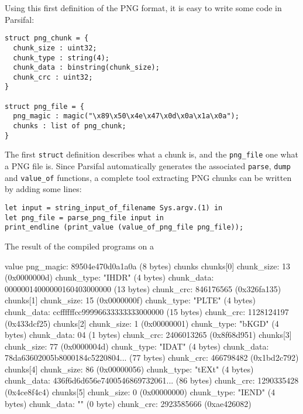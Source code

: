 \documentclass[conference]{IEEEtran}
\newenvironment{code}%
   {\scriptsize\snugshade\verbatim}%
   {\endverbatim\endsnugshade\normalsize}
\begin{document}
Using this first definition of the PNG format, it is easy to write
some code in Parsifal:

\begin{lstlisting}
struct png_chunk = {
  chunk_size : uint32;
  chunk_type : string(4);
  chunk_data : binstring(chunk_size);
  chunk_crc : uint32;
}

struct png_file = {
  png_magic : magic("\x89\x50\x4e\x47\x0d\x0a\x1a\x0a");
  chunks : list of png_chunk;
}
\end{lstlisting}

The first \texttt{struct} definition describes what a chunk is, and
the \texttt{png\_file} one what a PNG file is. Since Parsifal
automatically generates the associated \texttt{parse}, \texttt{dump}
and \texttt{value\_of} functions, a complete tool extracting PNG chunks
can be written by adding some lines:

\begin{lstlisting}
let input = string_input_of_filename Sys.argv.(1) in
let png_file = parse_png_file input in
print_endline (print_value (value_of_png_file png_file));
\end{lstlisting}

\noindent
The result of the compiled programs on a 

\begin{code}
value {
  png_magic: 89504e470d0a1a0a (8 bytes)
  chunks {
    chunks[0] {
      chunk_size: 13 (0x0000000d)
      chunk_type: "IHDR" (4 bytes)
      chunk_data: 00000014000000160403000000 (13 bytes)
      chunk_crc: 846176565 (0x326fa135)
    }
    chunks[1] {
      chunk_size: 15 (0x0000000f)
      chunk_type: "PLTE" (4 bytes)
      chunk_data: ccffffffcc99996633333333000000 (15 bytes)
      chunk_crc: 1128124197 (0x433dcf25)
    }
    chunks[2] {
      chunk_size: 1 (0x00000001)
      chunk_type: "bKGD" (4 bytes)
      chunk_data: 04 (1 bytes)
      chunk_crc: 2406013265 (0x8f68d951)
    }
    chunks[3] {
      chunk_size: 77 (0x0000004d)
      chunk_type: "IDAT" (4 bytes)
      chunk_data: 78da63602005b8000184c5220804... (77 bytes)
      chunk_crc: 466798482 (0x1bd2c792)
    }
    chunks[4] {
      chunk_size: 86 (0x00000056)
      chunk_type: "tEXt" (4 bytes)
      chunk_data: 436f6d6d656e7400546869732061... (86 bytes)
      chunk_crc: 1290335428 (0x4ce8f4c4)
    }
    chunks[5] {
      chunk_size: 0 (0x00000000)
      chunk_type: "IEND" (4 bytes)
      chunk_data: "" (0 byte)
      chunk_crc: 2923585666 (0xae426082)
    }
  }
}
\end{code}
\end{document}
